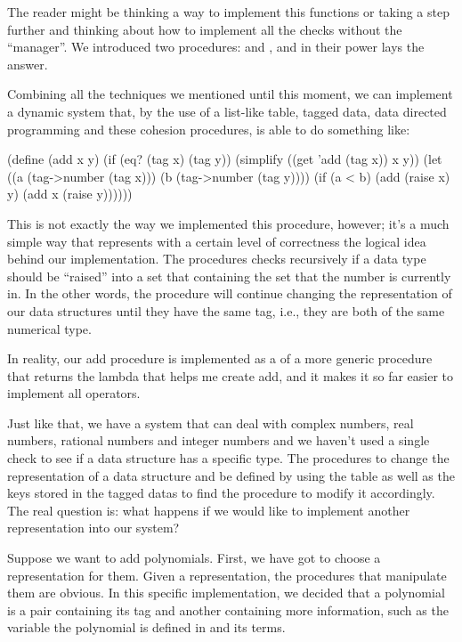 The reader might be thinking a way to implement this functions or taking a step further and thinking about how to implement all the checks without the ``manager''. We introduced two procedures:  and , and in their power lays the answer.

Combining all the techniques we mentioned until this moment, we can implement a dynamic system that, by the use of a list-like table, tagged data, data directed programming and these cohesion procedures, is able to do something like:

\begin{code}
(define (add x y)
  (if (eq? (tag x) (tag y))
      (simplify ((get 'add (tag x)) x y))
      (let ((a (tag->number (tag x)))
            (b (tag->number (tag y))))
        (if (a < b)
            (add (raise x) y)
            (add x (raise y))))))
\end{code}

This is not exactly the way we implemented this procedure, however; it's a much simple way that represents with a certain level of correctness the logical idea behind our implementation. The procedures checks recursively if a data type should be ``raised'' into a set that containing the set that the number is currently in. In the other words, the procedure will continue changing the representation of our data structures until they have the same tag, i.e., they are both of the same numerical type.

In reality, our add procedure is implemented as a  of a more generic procedure that returns the lambda that helps me create add, and it makes it so far easier to implement all operators.

Just like that, we have a system that can deal with complex numbers, real numbers, rational numbers and integer numbers and we haven't used a single check to see if a data structure has a specific type. The procedures to change the representation of a data structure and be defined by using the table as well as the keys stored in the tagged datas to find the procedure to modify it accordingly. The real question is: what happens if we would like to implement another representation into our system?

Suppose we want to add polynomials. First, we have got to choose a representation for them. Given a representation, the procedures that manipulate them are obvious. In this specific implementation, we decided that a polynomial is a pair containing its tag and another containing more information, such as the variable the polynomial is defined in and its terms.


